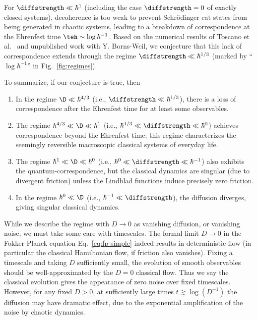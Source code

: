 \documentclass{article}
\numberwithin{equation}{section}
\begin{document}
For $\diffstrength \ll \hbar^{1}$ (including the  case $\diffstrength=0$ of exactly closed systems), decoherence is too weak to prevent Schr\"odinger cat states from being generated in chaotic systems, leading to a breakdown of correspondence at the Ehrenfest time $\teh\sim\log \hbar^{-1}$. Based on the numerical results of Toscano et al.~\cite{toscano2005decoherence,toscano2006quantum,wisniacki2009scaling} and unpublished work with Y. Borns-Weil, we conjecture that this lack of correspondence extends through the regime $\diffstrength \ll \hbar^{1/3}$ 
(marked by  ``$\log \hbar^{-1}$'' in Fig.~\ref{fig:regimes}). 

To summarize, if our conjecture is true, then 
\begin{enumerate}
    \item In the regime 
    $\D \ll \hbar^{4/3}$ (i.e., $\diffstrength \ll \hbar^{1/3}$), there is a loss of correspondence after the Ehrenfest time for at least some observables.
    \item The regime 
    $\hbar^{4/3} \ll \D \ll \hbar^{1}$ (i.e., $\hbar^{1/3} \ll \diffstrength \ll \hbar^{0}$) achieves correspondence beyond the Ehrenfest time; this regime characterizes the seemingly reversible macroscopic classical systems of everyday life. 
    \item The regime 
    $\hbar^{1} \ll \D \ll \hbar^{0}$ (i.e., $\hbar^{0} \ll \diffstrength \ll \hbar^{-1}$)
    also exhibits the quantum-correspondence, but the classical dynamics are singular (due to divergent friction) unless the Lindblad functions induce precisely zero friction.
    \item In the regime $\hbar^{0} \ll \D$ (i.e., $\hbar^{-1} \ll \diffstrength$), the diffusion diverges, giving singular classical dynamics.
\end{enumerate}

While we describe the regime with $D \to 0$ as vanishing diffusion, or vanishing noise, we must take some care with timescales.  The formal limit $D \to 0$ in the Fokker-Planck equation Eq.~\eqref{eq:fp-simple} indeed results in deterministic flow (in particular the classical Hamiltonian flow, if friction also vanishes). Fixing a timescale and taking $D$ sufficiently small, the evolution of smooth observables should be well-approximated by the $D=0$ classical flow.  Thus we say the classical evolution gives the appearance of zero noise over fixed timescales.  However, for any fixed $D>0$, at sufficiently large times $t \gtrsim \log(D^{-1})$ the diffusion may have dramatic effect, due to the exponential amplification of the noise by chaotic dynamics.
\end{document}
